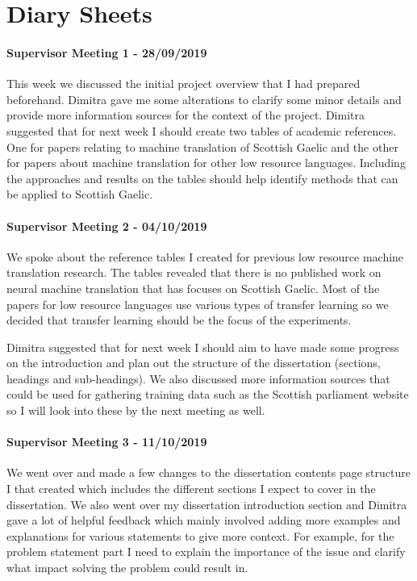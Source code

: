 \chapter{Diary Sheets}
\label{AppendixC}

\subsubsection{Supervisor Meeting 1 - 28/09/2019}
This week we discussed the initial project overview that I had prepared beforehand. Dimitra gave me some alterations to clarify some minor details and provide more information sources for the context of the project.
Dimitra suggested that for next week I should create two tables of academic references. One for papers relating to machine translation of Scottish Gaelic and the other for papers about machine translation for other low resource languages. Including the approaches and results on the tables should help identify methods that can be applied to Scottish Gaelic.


\subsubsection{Supervisor Meeting 2 - 04/10/2019}
We spoke about the reference tables I created for previous low resource machine translation research. The tables revealed that there is no published work on neural machine translation that has focuses on Scottish Gaelic. Most of the papers for low resource languages use various types of transfer learning so we decided that transfer learning should be the focus of the experiments.

Dimitra suggested that for next week I should aim to have made some progress on the introduction and plan out the structure of the dissertation (sections, headings and sub-headings). We also discussed more information sources that could be used for gathering training data such as the Scottish parliament website so I will look into these by the next meeting as well.


\subsubsection{Supervisor Meeting 3 - 11/10/2019}
We went over and made a few changes to the dissertation contents page structure I that created which includes the different sections I expect to cover in the dissertation. We also went over my dissertation introduction section and Dimitra gave a lot of helpful feedback which mainly involved adding more examples and explanations for various statements to give more context. For example, for the problem statement part I need to explain the importance of the issue and clarify what impact solving the problem could result in.

